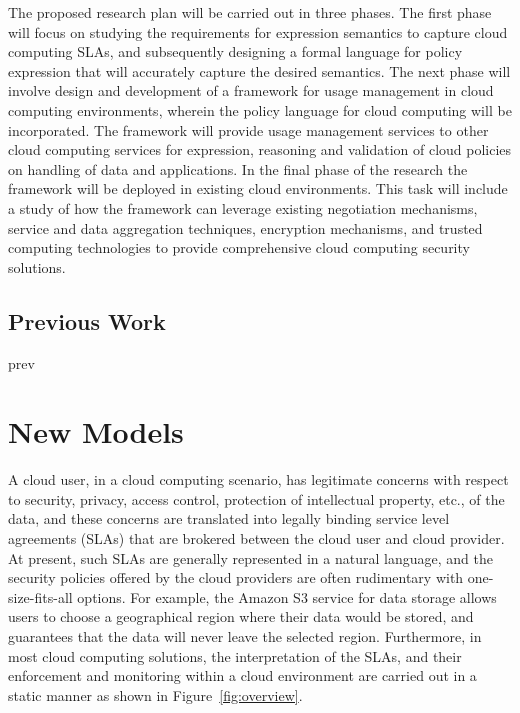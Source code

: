 \documentclass[10pt, conference, compsoc]{IEEEtran}
\begin{document}
The proposed research plan will be carried out in three phases. The first phase will focus on studying the requirements for expression semantics to capture cloud computing SLAs, and subsequently  designing a formal language for policy expression that will accurately capture the desired semantics. The next phase will involve design and development of a framework for usage management in cloud computing environments, wherein the policy language for cloud computing will be incorporated. The framework will provide usage management services to other cloud computing services for expression, reasoning and validation of cloud policies on handling of data and applications. In the final phase of the research the framework will be deployed in existing cloud environments. This task will include a study of how the framework can leverage existing negotiation mechanisms, service and data aggregation techniques, encryption mechanisms, and  trusted computing technologies  to provide comprehensive cloud computing security solutions. 

\subsection{Previous Work}
prev

\section{New Models}
A cloud user, in a cloud computing scenario, has legitimate concerns with respect to security, privacy, access control, protection of intellectual property, etc., of the data, and these concerns are translated into legally binding service level agreements (SLAs) that are brokered between the cloud user and cloud provider. At present, such SLAs are generally represented in a natural language, and the security policies offered by the cloud providers are often rudimentary with one-size-fits-all options. For example, the Amazon S3 service for data storage allows users to choose a geographical region where their data would be stored, and guarantees that the data will never leave the selected region. Furthermore, in most cloud computing solutions, the interpretation of the SLAs, and their enforcement and monitoring within a cloud environment are carried out in a static manner as shown in Figure~\ref{fig:overview}.
\end{document}
